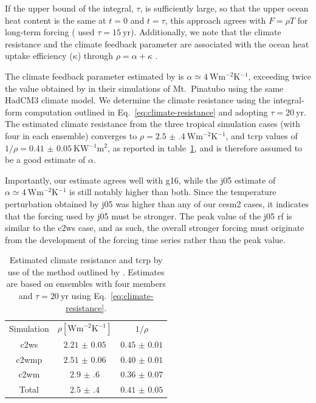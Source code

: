 \documentclass{ametsocV6.1}
\begin{document}
If the upper bound of the integral, \(\tau \), is sufficiently large, so that the upper
ocean heat content is the same at \(t=0\) and \(t=\tau \), this approach agrees with
\(F=\rho T\) for long-term forcing \citep{gregory2016} (\citet{merlis2014} used \(\tau
=\SI{15}{\mathrm{yr}}\)). Additionally, we note that the climate resistance and the
climate feedback parameter are associated with the ocean heat uptake efficiency
(\(\kappa \)) through \(\rho =\alpha +\kappa \) \citep{gregory2016}.

The climate feedback parameter estimated by \citet{jones2005} is \(\alpha \simeq
\SI{4}{\watt\metre^{-2}\kelvin^{-1}}\), exceeding twice the value obtained by
\citet{gregory2016} in their simulations of Mt.\ Pinatubo using the same HadCM3 climate
model. We determine the climate resistance using the integral-form computation outlined
in Eq.~\ref{eq:climate-resistance} and adopting \(\tau =\SI{20}{\mathrm{yr}}\). The
estimated climate resistance from the three tropical simulation cases (with four in each
ensemble) converges to \(\rho =\SI{2.5(4)}{\watt\metre^{-2}\kelvin^{-1}}\), and
\gls{tcrp} values of \(1/\rho=\SI{0.41(5)}{\kelvin\watt^{-1}\metre^{2}}\), as reported
in table~\ref{tab:trcp}, and is therefore assumed to be a good estimate of \(\alpha\).

Importantly, our estimate agrees well with \gls{g16}, while the \gls{j05} estimate of
\(\alpha \simeq \SI{4}{\watt\metre^{-2}\kelvin^{-1}}\) is still notably higher than
both. Since the temperature perturbation obtained by \gls{j05} was higher than any of
our \gls{cesm2} cases, it indicates that the forcing used by \gls{j05} must be stronger.
The peak value of the \gls{j05} \gls{rf} is similar to the \gls{c2ws} case, and as such,
the overall stronger forcing must originate from the development of the forcing time
series rather than the peak value.

\begin{table}
  \centering

  \caption{Estimated climate resistance and \gls{tcrp} by use of the method outlined by
    \citet{merlis2014}. Estimates are based on ensembles with four members and \(\tau
    =\SI{20}{\mathrm{yr}}\) using Eq.~\ref{eq:climate-resistance}.}\label{tab:trcp}%
  \begin{tabular}{ccc}
    Simulation  & \(\rho [\si{\watt\metre^{-2}\kelvin^{-1}}]\) & \(1/\rho\)        \\
    \gls{c2ws}  & \(\num{2.21(5)}\)                            & \(\num{0.45(1)}\) \\
    \gls{c2wmp} & \(\num{2.51(6)}\)                            & \(\num{0.40(1)}\) \\
    \gls{c2wm}  & \(\num{2.9(6)}\)                             & \(\num{0.36(7)}\) \\
    Total       & \(\num{2.5(4)}\)                             & \(\num{0.41(5)}\) \\
  \end{tabular}
\end{table}
\end{document}
